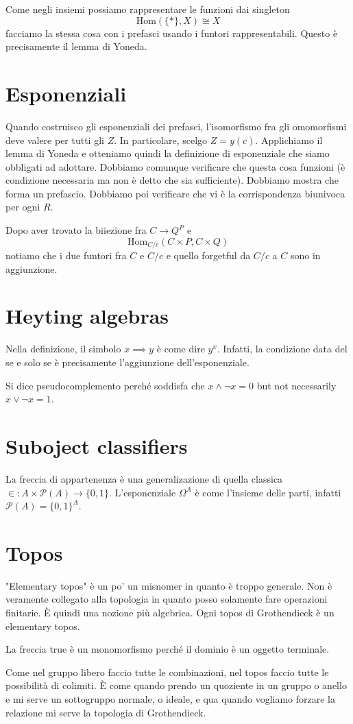 \documentclass[a4paper]{article}
\begin{document}
Come negli insiemi possiamo rappresentare le funzioni dai singleton
\[
    \text{Hom}(\{\ast\}, X) \cong X
\]
facciamo la stessa cosa con i prefasci usando i funtori rappresentabili.
Questo è precisamente il lemma di Yoneda.

\section{Esponenziali}

Quando costruisco gli esponenziali dei prefasci,
l'isomorfismo fra gli omomorfismi deve valere per tutti gli
\(Z\). In particolare, scelgo \(Z=y(c)\).
Applichiamo il lemma di Yoneda e
otteniamo quindi la definizione di esponenziale
che siamo obbligati ad adottare. Dobbiamo comunque verificare
che questa cosa funzioni (è condizione necessaria ma non è detto che sia sufficiente).
Dobbiamo mostra che forma un prefascio.
Dobbiamo poi verificare che vi è la corrispondenza biunivoca
per ogni \(R\).

Dopo aver trovato la biiezione
fra \(C \to Q^P\) e
\[
    \text{Hom}_{C/c}(C \times P, C \times Q)
\]
notiamo che i due funtori
fra \(C\) e \(C/c\)
e quello forgetful da \(C/c\) a \(C\) sono in aggiunzione.

\section{Heyting algebras}

Nella definizione, il simbolo \(x \implies y\)
è come dire \(y^x\).
Infatti, la condizione data del se e solo se è precisamente l'aggiunzione dell'esponenziale.

Si dice pseudocomplemento perché
soddisfa che \(x \land \lnot x = 0\)
but not necessarily \(x \lor \lnot x = 1\).

\section{Suboject classifiers}

La freccia di appartenenza è una generalizazione di quella classica \(\in \colon A \times \mathcal{P}(A) \to \{0,1\}\).
L'esponenziale \(\Omega^A\) è come l'insieme delle parti, infatti
\(\mathcal{P}(A) = {\{0,1\}}^A\).

\section{Topos}

"Elementary topos" è un po' un misnomer in quanto
è troppo generale.
Non è veramente collegato alla topologia in quanto posso solamente fare operazioni finitarie.
È quindi una nozione più algebrica.
Ogni topos di Grothendieck è un elementary topos.

La freccia true è un monomorfismo perché il dominio è un oggetto terminale.

Come nel gruppo libero faccio tutte le combinazioni, nel topos faccio tutte le possibilità
di colimiti. È come quando prendo un quoziente in un gruppo o anello e mi serve un sottogruppo normale,
o ideale, e qua quando vogliamo forzare la relazione mi serve la topologia di Grothendieck.


\end{document}
